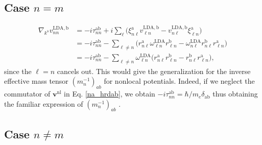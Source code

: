 
\subsection{Case \texorpdfstring{$n=m$}{n=m}}

\begin{align}\label{ntita}
\nabla_{k^{\mathrm{a}}}v^{\mathrm{LDA},\mathrm{b}}_{nn}&=
-i\tau^{\mathrm{a}\mathrm{b}}_{nn}
+i
\sum_{\ell}
\bigg(
\xi^{\mathrm{a}}_{n\ell}
v^{\mathrm{LDA},\mathrm{b}}_{\ell n}
-
v^{\mathrm{LDA},\mathrm{b}}_{n\ell}
\xi^{\mathrm{a}}_{\ell n}
\bigg)
\nonumber\\
&=
-i\tau^{\mathrm{a}\mathrm{b}}_{nn}
-
\sum_{\ell\ne n}
\bigg(
r^{\mathrm{a}}_{n\ell}
\omega^\mathrm{LDA}_{\ell n}
r^\mathrm{b}_{\ell n}
-
\omega^\mathrm{LDA}_{n\ell}
r^\mathrm{b}_{n\ell}
r^{\mathrm{a}}_{\ell n}
\bigg)
\nonumber\\
&=
-i\tau^{\mathrm{a}\mathrm{b}}_{nn}
-
\sum_{\ell\ne n}
\omega^\mathrm{LDA}_{\ell n}
\bigg(
r^{\mathrm{a}}_{n\ell}
r^\mathrm{b}_{\ell n}
-
r^\mathrm{b}_{n\ell}
r^{\mathrm{a}}_{\ell n}
\bigg)
,
\end{align}
since the $\ell=n$ cancels out. This would give the generalization for the
inverse effective mass tensor $(m_n^{-1})_{ab}$ for nonlocal potentials. Indeed,
if we neglect the commutator of $\mathbf{v}^\mathrm{nl}$ in
Eq. \eqref{na_hrdab}, we obtain
$-i\tau^{\mathrm{a}\mathrm{b}}_{nn}=\hbar/m_e\delta_{\mathrm{a}\mathrm{b}}$ thus
obtaining the  familiar expression of $(m_n^{-1})_{ab}$ \cite{ashcroftbook}.



\subsection{Case \texorpdfstring{$n\ne m$}{n!=m}}

